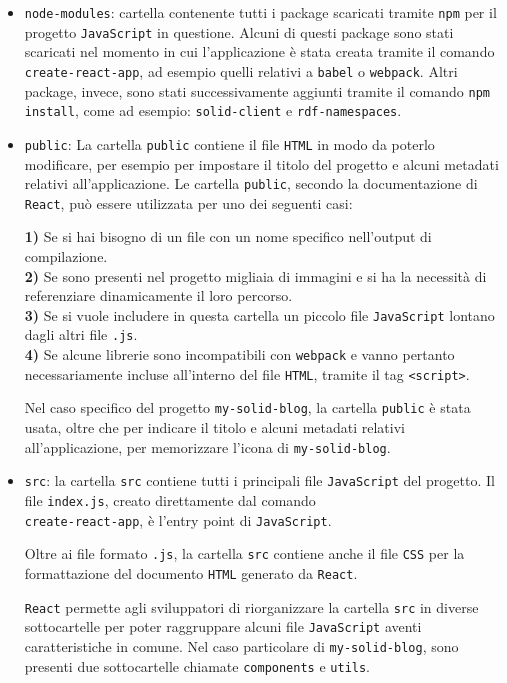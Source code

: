 \begin{itemize}
	\item {\tt node-modules}: cartella contenente tutti i package scaricati tramite {\tt npm} per il progetto {\tt JavaScript} in questione. Alcuni di questi package sono stati scaricati nel momento in cui l'applicazione è stata creata tramite il comando {\tt create-react-app}, ad esempio quelli relativi a {\tt babel} o {\tt webpack}. Altri package, invece, sono stati successivamente aggiunti tramite il comando {\tt npm install}, come ad esempio: {\tt solid-client} e {\tt rdf-namespaces}.
	\item {\tt public}: La cartella {\tt public} contiene il file {\tt HTML} in modo da poterlo modificare, per esempio per impostare il titolo del progetto e alcuni metadati relativi all'applicazione. Le cartella {\tt public}, secondo la documentazione di {\tt React}, può essere utilizzata per uno dei seguenti casi:
	
	\medskip
	
	\textbf{1)} Se si hai bisogno di un file con un nome specifico nell'output di compilazione.\\
	\textbf{2)} Se sono presenti nel progetto migliaia di immagini e si ha la necessità di referenziare dinamicamente il loro percorso.\\
	\textbf{3)} Se si vuole includere in questa cartella un piccolo file {\tt JavaScript} lontano dagli altri file {\tt .js}.\\
	\textbf{4)} Se alcune librerie sono incompatibili con {\tt webpack} e vanno pertanto necessariamente incluse all'interno del file {\tt HTML}, tramite il tag {\tt <script>}.
	
	\medskip
	
	Nel caso specifico del progetto {\tt my-solid-blog}, la cartella {\tt public} è stata usata, oltre che per indicare il titolo e alcuni metadati relativi all'applicazione, per memorizzare l'icona di {\tt my-solid-blog}.
	
	\item {\tt src}: la cartella {\tt src} contiene tutti i principali file {\tt JavaScript} del progetto. Il file {\tt index.js}, creato direttamente dal comando\\{\tt create-react-app}, è l'entry point di {\tt JavaScript}.
	
	\medskip 
	
	Oltre ai file formato {\tt .js}, la cartella {\tt src} contiene anche il file {\tt CSS} per la formattazione del documento {\tt HTML} generato da {\tt React}.
	
	\medskip
	
	{\tt React} permette agli sviluppatori di riorganizzare la cartella {\tt src} in diverse sottocartelle per poter raggruppare alcuni file {\tt JavaScript} aventi caratteristiche in comune. Nel caso particolare di {\tt my-solid-blog}, sono presenti due sottocartelle chiamate {\tt components} e {\tt utils}.
\end{itemize}

